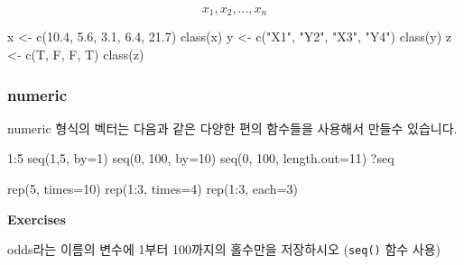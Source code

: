 \documentclass[
]{book}
\newenvironment{Shaded}{\begin{snugshade}}{\end{snugshade}}
\newcommand{\AttributeTok}[1]{\textcolor[rgb]{0.77,0.63,0.00}{#1}}
\newcommand{\DecValTok}[1]{\textcolor[rgb]{0.00,0.00,0.81}{#1}}
\newcommand{\FloatTok}[1]{\textcolor[rgb]{0.00,0.00,0.81}{#1}}
\newcommand{\FunctionTok}[1]{\textcolor[rgb]{0.00,0.00,0.00}{#1}}
\newcommand{\NormalTok}[1]{#1}
\newcommand{\OtherTok}[1]{\textcolor[rgb]{0.56,0.35,0.01}{#1}}
\newcommand{\SpecialCharTok}[1]{\textcolor[rgb]{0.00,0.00,0.00}{#1}}
\newcommand{\StringTok}[1]{\textcolor[rgb]{0.31,0.60,0.02}{#1}}
\begin{document}
\[ x_1, x_2, ..., x_n \]

\begin{Shaded}
\begin{Highlighting}[]
\NormalTok{x }\OtherTok{\textless{}{-}} \FunctionTok{c}\NormalTok{(}\FloatTok{10.4}\NormalTok{, }\FloatTok{5.6}\NormalTok{, }\FloatTok{3.1}\NormalTok{, }\FloatTok{6.4}\NormalTok{, }\FloatTok{21.7}\NormalTok{) }
\FunctionTok{class}\NormalTok{(x)}
\NormalTok{y }\OtherTok{\textless{}{-}} \FunctionTok{c}\NormalTok{(}\StringTok{"X1"}\NormalTok{, }\StringTok{"Y2"}\NormalTok{,  }\StringTok{"X3"}\NormalTok{,  }\StringTok{"Y4"}\NormalTok{)}
\FunctionTok{class}\NormalTok{(y)}
\NormalTok{z }\OtherTok{\textless{}{-}} \FunctionTok{c}\NormalTok{(T, F, F, T)}
\FunctionTok{class}\NormalTok{(z)}
\end{Highlighting}
\end{Shaded}

\hypertarget{numeric}{%
\subsubsection{numeric}\label{numeric}}

numeric 형식의 벡터는 다음과 같은 다양한 편의 함수들을 사용해서 만들수 있습니다.

\begin{Shaded}
\begin{Highlighting}[]
\DecValTok{1}\SpecialCharTok{:}\DecValTok{5}
\FunctionTok{seq}\NormalTok{(}\DecValTok{1}\NormalTok{,}\DecValTok{5}\NormalTok{, }\AttributeTok{by=}\DecValTok{1}\NormalTok{)}
\FunctionTok{seq}\NormalTok{(}\DecValTok{0}\NormalTok{, }\DecValTok{100}\NormalTok{, }\AttributeTok{by=}\DecValTok{10}\NormalTok{)}
\FunctionTok{seq}\NormalTok{(}\DecValTok{0}\NormalTok{, }\DecValTok{100}\NormalTok{, }\AttributeTok{length.out=}\DecValTok{11}\NormalTok{)}
\NormalTok{?seq}

\FunctionTok{rep}\NormalTok{(}\DecValTok{5}\NormalTok{, }\AttributeTok{times=}\DecValTok{10}\NormalTok{)}
\FunctionTok{rep}\NormalTok{(}\DecValTok{1}\SpecialCharTok{:}\DecValTok{3}\NormalTok{, }\AttributeTok{times=}\DecValTok{4}\NormalTok{)}
\FunctionTok{rep}\NormalTok{(}\DecValTok{1}\SpecialCharTok{:}\DecValTok{3}\NormalTok{, }\AttributeTok{each=}\DecValTok{3}\NormalTok{)}
\end{Highlighting}
\end{Shaded}

\textbf{Exercises}

odds라는 이름의 변수에 1부터 100까지의 홀수만을 저장하시오 (\texttt{seq()} 함수 사용)
\end{document}
